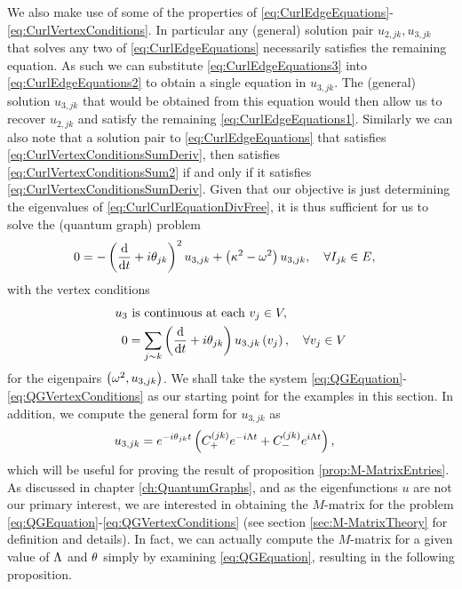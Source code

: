 We also make use of some of the properties of \eqref{eq:CurlEdgeEquations}-\eqref{eq:CurlVertexConditions}.
In particular any (general) solution pair $u_{2,jk},u_{3,jk}$ that solves any two of \eqref{eq:CurlEdgeEquations} necessarily satisfies the remaining equation.
As such we can substitute \eqref{eq:CurlEdgeEquations3} into \eqref{eq:CurlEdgeEquations2} to obtain a single equation in $u_{3,jk}$.
The (general) solution $u_{3,jk}$ that would be obtained from this equation would then allow us to recover $u_{2,jk}$ and satisfy the remaining \eqref{eq:CurlEdgeEquations1}.
Similarly we can also note that a solution pair to \eqref{eq:CurlEdgeEquations} that satisfies \eqref{eq:CurlVertexConditionsSumDeriv}, then satisfies \eqref{eq:CurlVertexConditionsSum2} if and only if it satisfies \eqref{eq:CurlVertexConditionsSumDeriv}.
Given that our objective is just determining the eigenvalues of \eqref{eq:CurlCurlEquationDivFree}, it is thus sufficient for us to solve the (quantum graph) problem
\begin{align} \label{eq:QGEquation}
	0 &= -\left( \dfrac{\mathrm{d}}{\mathrm{d}t} + i\theta_{jk} \right)^2 u_{3,jk} + \left( \kappa^2 - \omega^2 \right)u_{3,jk},
	\quad \forall I_{jk}\in E,
\end{align}
with the vertex conditions
\begin{subequations} \label{eq:QGVertexConditions}
	\begin{align}
		u_3 &\text{ is continuous at each } v_j\in V, \\
		0 &= \sum_{j\sim k} \left( \dfrac{\mathrm{d}}{\mathrm{d}t} + i\theta_{jk} \right)u_{3,jk}\left( v_j \right), \quad\forall v_j\in V
	\end{align}
\end{subequations}
for the eigenpairs $\left( \omega^2, u_{3,jk} \right)$.
We shall take the system \eqref{eq:QGEquation}-\eqref{eq:QGVertexConditions} as our starting point for the examples in this section.
In addition, we compute the general form for $u_{3,jk}$ as
\begin{align} \label{eq:CurlEdgeEqnGenSol}
	u_{3,jk} &= e^{-i\theta_{jk}t}\left(  C_{+}^{(jk)}e^{-i\Lambda t} + C_{-}^{(jk)}e^{i\Lambda t}  \right),
\end{align}
which will be useful for proving the result of proposition \ref{prop:M-MatrixEntries}. 
As discussed in chapter \ref{ch:QuantumGraphs}, and as the eigenfunctions $u$ are not our primary interest, we are interested in obtaining the $M$-matrix for the problem \eqref{eq:QGEquation}-\eqref{eq:QGVertexConditions} (see section \ref{sec:M-MatrixTheory} for definition and details).
In fact, we can actually compute the $M$-matrix for a given value of $\Lambda$ and $\theta$ simply by examining \eqref{eq:QGEquation}, resulting in the following proposition.
